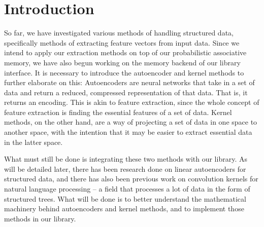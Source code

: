 \documentclass{sig-alternate}
\begin{document}



\section{Introduction}
\label{sec:intro}

So far, we have investigated various methods of handling structured data, 
specifically methods of extracting feature vectors from input data. Since
we intend to apply our extraction methods on top of our probabilistic 
associative memory, we have also begun working on the memory backend of our
library interface. It is necessary to introduce the autoencoder and kernel 
methods to further elaborate on this: Autoencoders are neural networks that
take in a set of data and return a reduced, compressed representation of that
data. That is, it returns an encoding. This is akin to feature extraction, 
since the whole concept of feature extraction is finding the essential features 
of a set of data. Kernel methods, on the other hand, are a way of projecting
a set of data in one space to another space, with the intention that it may
be easier to extract essential data in the latter space.

What must still be done is integrating these two methods with our library.
As will be detailed later, there has been research done on linear autoencoders
for structured data, and there has also been previous work on convolution 
kernels for natural language processing -- a field that processes a lot of 
data in the form of structured trees. What will be done is to better understand
the mathematical machinery behind autoencoders and kernel methods, and to
implement those methods in our library.
\end{document}
